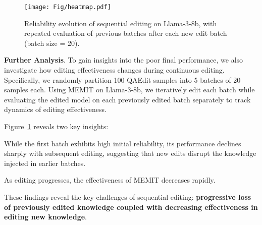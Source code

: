 \begin{figure}
    \centering
    \texttt{[image: Fig/heatmap.pdf]}
    \captionsetup{skip=2pt}
    \caption{Reliability evolution of sequential editing on Llama-3-8b, with repeated evaluation of previous batches after each new edit batch (batch size = 20).}
    \label{fig:heatmap}
\end{figure}




\noindent\textbf{Further Analysis}.
To gain insights into the poor final performance, we also investigate how editing effectiveness changes during continuous editing.
Specifically, we randomly partition 100 QAEdit samples into 5 batches of 20 samples each.
Using MEMIT on Llama-3-8b, we iteratively edit each batch while evaluating the edited model on each previously edited batch separately to track dynamics of editing effectiveness.


Figure~\ref{fig:heatmap} reveals two key insights: 
\begin{enumerate*}[label=\roman*)] 
    \item While the first batch exhibits high initial reliability, its performance declines sharply with subsequent editing, suggesting that new edits disrupt the knowledge injected in earlier batches.
    \item As editing progresses, the effectiveness of MEMIT decreases rapidly.
\end{enumerate*} 
These findings reveal the key challenges of sequential editing: \textbf{progressive loss of previously edited knowledge coupled with decreasing effectiveness in editing new knowledge}.



